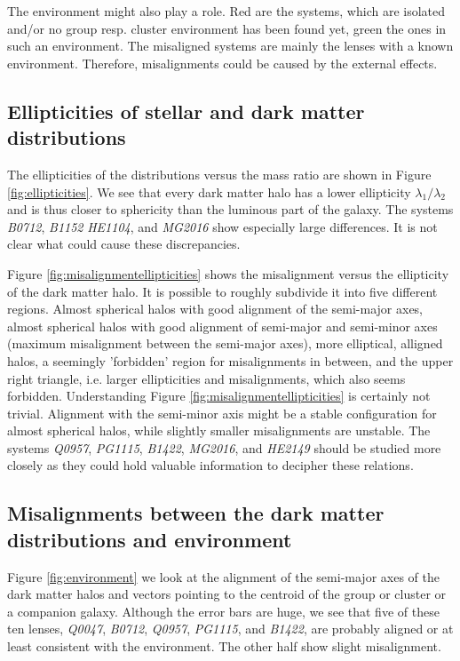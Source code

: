 \documentclass[useAMS,usenatbib]{mn2e}
\begin{document}
The environment might also play a role. Red are the systems, which are isolated and/or no group resp. cluster environment has been found yet, green the ones in such an environment. The misaligned systems are mainly the lenses with a known environment. Therefore, misalignments could be caused by the external effects.


\subsection{Ellipticities of stellar and dark matter distributions}
The ellipticities of the distributions versus the mass ratio are shown in Figure \ref{fig:ellipticities}. We see that every dark matter halo has a lower ellipticity $\lambda_{1}/\lambda_{2}$ and is thus closer to sphericity than the luminous part of the galaxy. The systems \textit{B0712}, \textit{B1152} \textit{HE1104}, and \textit{MG2016} show especially large differences. It is not clear what could cause these discrepancies.

Figure \ref{fig:misalignmentellipticities} shows the misalignment versus the ellipticity of the dark matter halo. It is possible to roughly subdivide it into five different regions. Almost spherical halos with good alignment of the semi-major axes, almost spherical halos with good alignment of semi-major and semi-minor axes (maximum misalignment between the semi-major axes), more elliptical, alligned halos, a seemingly 'forbidden' region for misalignments in between, and the upper right triangle, i.e. larger ellipticities and misalignments, which also seems forbidden. Understanding Figure \ref{fig:misalignmentellipticities} is certainly not trivial. Alignment with the semi-minor axis might be a stable configuration for almost spherical halos, while slightly smaller misalignments are unstable. The systems \textit{Q0957}, \textit{PG1115}, \textit{B1422}, \textit{MG2016}, and \textit{HE2149} should be studied more closely as they could hold valuable information to decipher these relations.






\subsection{Misalignments between the dark matter distributions and environment}
Figure \ref{fig:environment} we look at the alignment of the semi-major axes of the dark matter halos and vectors pointing to the centroid of the group or cluster or a companion galaxy. Although the error bars are huge, we see that five of these ten lenses, \textit{Q0047}, \textit{B0712}, \textit{Q0957}, \textit{PG1115}, and \textit{B1422}, are probably aligned or at least consistent with the environment. The other half show slight misalignment.
\end{document}
